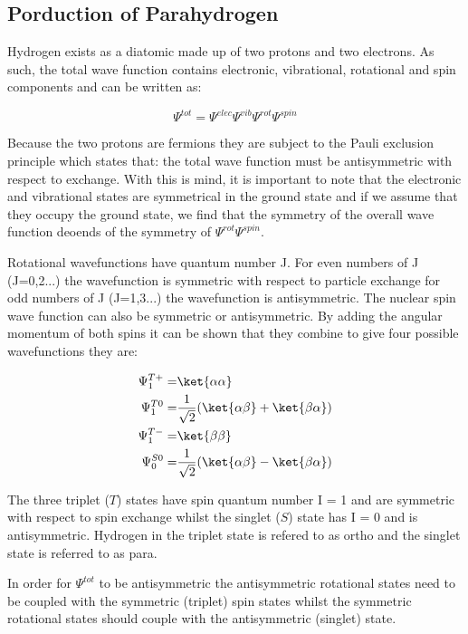 \subsection{Porduction of Parahydrogen}

Hydrogen exists as a diatomic made up of two protons and two electrons. As such, the total
wave function contains electronic, vibrational, rotational and spin components and can be
written as:

\begin{equation}
 \Psi^{tot} =\Psi^{elec}\Psi^{vib}\Psi^{rot}\Psi^{spin}
\end{equation}

Because the two protons are fermions they are subject to the Pauli exclusion principle
which states that: the total wave function must be antisymmetric with respect to exchange. With
this is mind, it is important to note that the electronic and vibrational states are symmetrical in the ground state and if we assume that they occupy the ground state, we find that the symmetry of the overall wave function deoends of the symmetry of $\Psi^{rot}$$\Psi^{spin}$.

Rotational wavefunctions have quantum number J. For even numbers of J (J=0,2...) the wavefunction is symmetric with respect to particle exchange for odd numbers of J (J=1,3...) the wavefunction is antisymmetric. The nuclear spin wave function can also be symmetric or antisymmetric. By adding the angular momentum of both spins it can be shown that they combine to give four possible wavefunctions
they are:

\begin{align}
\Psi_{1}^{T+} =& \ket{\alpha\alpha}\\
\Psi_{1}^{T0} =& \frac{1}{\sqrt{2}} (\ket{\alpha\beta}+\ket{\beta\alpha})\\
\Psi_{1}^{T-} =& \ket{\beta\beta}\\
\Psi_{0}^{S0} =& \frac{1}{\sqrt{2}} (\ket{\alpha\beta}-\ket{\beta\alpha})
\end{align}

The three triplet ($T$) states have spin quantum number I = 1 and are symmetric with respect to spin exchange whilst
the singlet ($S$) state has I = 0 and is antisymmetric. Hydrogen in the triplet state is refered to as ortho and the
singlet state is referred to as para.

In order for $\Psi^{tot}$ to be antisymmetric the antisymmetric rotational states need to be coupled with the symmetric (triplet) spin states whilst the symmetric rotational states should couple with the antisymmetric (singlet) state.

